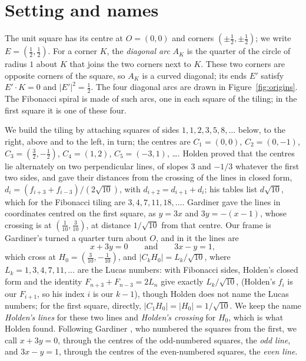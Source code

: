 \documentclass[11pt,a4paper]{article}
\theoremstyle{plain}
\theoremstyle{definition}
\theoremstyle{remark}
\begin{document}
\section{Setting and names}

The unit square has its centre at $O=(0,0)$ and corners $(\pm\tfrac12,\pm\tfrac12)$; we write $E=(\tfrac12,\tfrac12)$. For a corner $K$, the \emph{diagonal arc} $A_K$ is the quarter of the circle of radius $1$ about $K$ that joins the two corners next to $K$. These two corners are opposite corners of the square, so $A_K$ is a curved diagonal; its ends $E'$ satisfy $E'\cdot K=0$ and $|E'|^2=\tfrac12$. The four diagonal arcs are drawn in Figure~\ref{fig:origins}. The Fibonacci spiral is made of such arcs, one in each square of the tiling; in the first square it is one of these four.

We build the tiling by attaching squares of sides $1,1,2,3,5,8,\dots$ below, to the right, above and to the left, in turn; the centres are $C_1=(0,0)$, $C_2=(0,-1)$, $C_3=(\tfrac32,-\tfrac12)$, $C_4=(1,2)$, $C_5=(-3,1)$, \dots. Holden \cite{holden} proved that the centres lie alternately on two perpendicular lines, of slopes $3$ and $-1/3$ whatever the first two sides, and gave their distances from the crossing of the lines in closed form, $d_i=(f_{i+3}+f_{i-3})/(2\sqrt{10})$, with $d_{i+2}=d_{i+1}+d_i$; his tables list $d\sqrt{10}$, which for the Fibonacci tiling are $3,4,7,11,18,\dots$. Gardiner \cite{gardiner} gave the lines in coordinates centred on the first square, as $y=3x$ and $3y=-(x-1)$, whose crossing is at $(\tfrac1{10},\tfrac3{10})$, at distance $1/\sqrt{10}$ from that centre. Our frame is Gardiner's turned a quarter turn about $O$, and in it the lines are
\[
  x+3y=0 \qquad\text{and}\qquad 3x-y=1,
\]
which cross at $H_0=(\tfrac3{10},-\tfrac1{10})$, and $|C_kH_0| = L_k/\sqrt{10}$, where $L_k=1,3,4,7,11,\dots$ are the Lucas numbers: with Fibonacci sides, Holden's closed form and the identity $F_{n+3}+F_{n-3}=2L_n$ give exactly $L_k/\sqrt{10}$, (Holden's $f_i$ is our $F_{i+1}$, so his index $i$ is our $k-1$), though Holden does not name the Lucas numbers; for the first square, directly, $|C_1H_0|=|H_0|=1/\sqrt{10}$. We keep the name \emph{Holden's lines} for these two lines and \emph{Holden's crossing} for $H_0$, which is what Holden found. Following Gardiner \cite{gardiner}, who numbered the squares from the first, we call $x+3y=0$, through the centres of the odd-numbered squares, the \emph{odd line}, and $3x-y=1$, through the centres of the even-numbered squares, the \emph{even line}.
\end{document}
